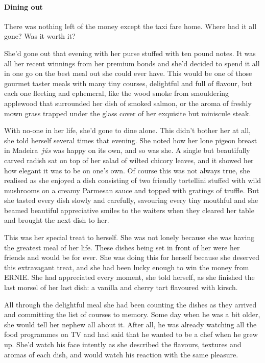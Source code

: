


\prelude

\paragraph{Dining out}\strut

There was nothing left of the money except the taxi fare home.  Where
had it all gone? Was it worth it?

She'd gone out that evening with her purse stuffed with ten pound
notes.  It was all her recent winnings from her premium bonds and
she'd decided to spend it all in one go on the best meal out she could
ever have.  This would be one of those gourmet taster meals with many
tiny courses, delightful and full of flavour, but each one fleeting and
ephemeral, like the wood smoke from smouldering applewood that
surrounded her dish of smoked salmon, or the aroma of freshly mown
grass trapped under the glass cover of her exquisite but miniscule
steak.

With no-one in her life, she'd gone to dine alone.  This didn't bother
her at all, she told herself several times that evening.  She noted
how her lone pigeon breast in Madeira~\textit{jús} was happy on its
own, and so was she. A single but beautifully carved radish sat on top
of her salad of wilted chicory leaves, and it showed her how elegant
it was to be on one's own.  Of course this was not always true, she
realised as she enjoyed a dish consisting of two friendly tortellini
stuffed with wild mushrooms on a creamy Parmesan sauce and topped with
gratings of truffle. But she tasted every dish slowly and carefully,
savouring every tiny mouthful and she beamed beautiful appreciative
smiles to the waiters when they cleared her table and brought the next
dish to her.

This was her special treat to herself. She was not lonely because she
was having the greatest meal of her life.  These dishes being set in
front of her were her friends and would be for ever. She was doing
this for herself because she deserved this extravagant treat, and she
had been lucky enough to win the money from ERNIE. She had appreciated
every moment, she told herself, as she finished the last morsel of her
last dish: a vanilla and cherry tart flavoured with kirsch.

All through the delightful meal she had been counting the dishes as
they arrived and committing the list of courses to memory.  Some day
when he was a bit older, she would tell her nephew all about it.
After all, he was already watching all the food programmes on TV and
had said that he wanted to be a chef when he grew up.  She'd watch his
face intently as she described the flavours, textures and aromas of
each dish, and would watch his reaction with the same pleasure.

